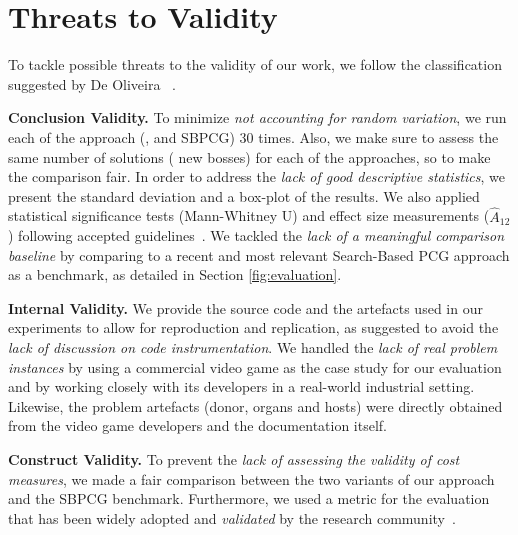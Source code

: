 \section{Threats to Validity}
\label{sec:Threats}

To tackle possible threats to the validity of our work, we follow the classification suggested by De Oliveira \etal~\cite{oliveira2011threats}.

 \textbf{Conclusion Validity.}
To minimize \textit{not accounting for random variation}, we run each of the approach (\ie \simhotep, \timhotep and SBPCG) 30 times. Also, we make sure to assess the same number of solutions ( new bosses) for each of the approaches, so to make the comparison fair. In order to address the \textit{lack of good descriptive statistics}, we present the standard deviation and a box-plot of the results. We also applied statistical significance tests (Mann-Whitney U) and effect size measurements ($\hat{A}_{12}$) following accepted guidelines~\cite{arcuri2013parameter}. We tackled the \textit{lack of a meaningful comparison baseline} by comparing \ApproachName{} to a recent and most relevant Search-Based PCG approach as a benchmark, as detailed in Section \ref{fig:evaluation}. 

\noindent \textbf{Internal Validity.}
We provide the source code and the artefacts used in our experiments to allow for reproduction and replication, as suggested to avoid the \textit{lack of discussion on code instrumentation}.
We handled the \textit{lack of real problem instances} by using a commercial video game as the case study for our evaluation and by working closely with its developers in a real-world industrial setting. 
Likewise, the problem artefacts (donor, organs and hosts) were directly obtained from the video game developers and the documentation itself. 

\noindent \textbf{Construct Validity.}
To prevent the \textit{lack of assessing the validity of cost measures}, we made a fair comparison between the two variants of our approach and the SBPCG benchmark. Furthermore, we used a metric for the evaluation that has been widely adopted and \textit{validated} by the research community~\cite{browne2010evolutionary}.

